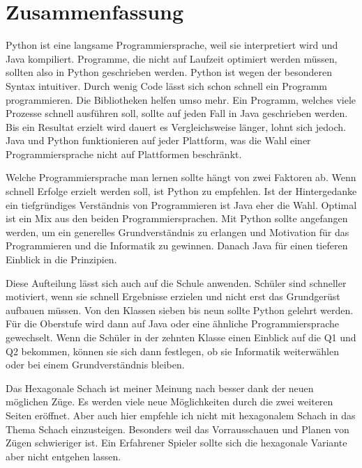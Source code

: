 \chapter{Zusammenfassung}

Python ist eine langsame Programmiersprache, weil sie interpretiert wird und Java kompiliert. Programme, die nicht auf Laufzeit optimiert werden müssen, sollten also in Python geschrieben werden. Python ist wegen der besonderen Syntax intuitiver. Durch wenig Code lässt sich schon schnell ein Programm programmieren. Die Bibliotheken helfen umso mehr. Ein Programm, welches viele Prozesse schnell ausführen soll, sollte auf jeden Fall in Java geschrieben werden. Bis ein Resultat erzielt wird dauert es Vergleichsweise länger, lohnt sich jedoch. Java und Python funktionieren auf jeder Plattform, was die Wahl einer Programmiersprache nicht auf Plattformen beschränkt.\par
Welche Programmiersprache man lernen sollte hängt von zwei Faktoren ab. Wenn schnell Erfolge erzielt werden soll, ist Python zu empfehlen. Ist der Hintergedanke ein tiefgründiges Verständnis von Programmieren ist Java eher die Wahl. Optimal ist ein Mix aus den beiden Programmiersprachen. Mit Python sollte angefangen werden, um ein generelles Grundverständnis zu erlangen und Motivation für das Programmieren und die Informatik zu gewinnen. Danach Java für einen tieferen Einblick in die Prinzipien.\par
Diese Aufteilung lässt sich auch auf die Schule anwenden. Schüler sind schneller motiviert, wenn sie schnell Ergebnisse erzielen und nicht erst das Grundgerüst aufbauen müssen. Von den Klassen sieben bis neun sollte Python gelehrt werden. Für die Oberstufe wird dann auf Java oder eine ähnliche Programmiersprache gewechselt. Wenn die Schüler in der zehnten Klasse einen Einblick auf die Q1 und Q2 bekommen, können sie sich dann festlegen, ob sie Informatik weiterwählen oder bei einem Grundverständnis bleiben.\par
Das Hexagonale Schach ist meiner Meinung nach besser dank der neuen möglichen Züge. Es werden viele neue Möglichkeiten durch die zwei weiteren Seiten eröffnet. Aber auch hier empfehle ich nicht mit hexagonalem Schach in das Thema Schach einzusteigen. Besonders weil das Vorrausschauen und Planen von Zügen schwieriger ist. Ein Erfahrener Spieler sollte sich die hexagonale Variante aber nicht entgehen lassen.
